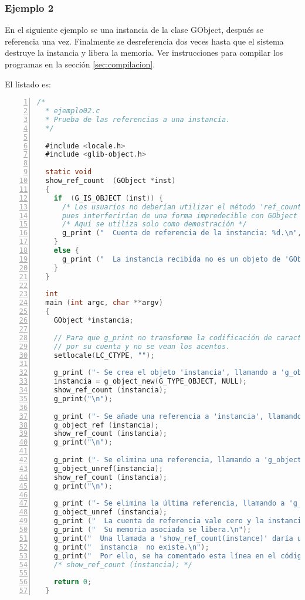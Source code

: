 \subsubsection{Ejemplo 2}
En el siguiente ejemplo se una instancia de la clase \textsf{GObject}, después se
referencia una vez.
Finalmente se desreferencia dos veces hasta que el sistema destruye la instancia y
libera la memoria.
Ver instrucciones para compilar los programas en la sección \ref{sec:compilacion}.

El listado es:
\begin{lstlisting}[language=C, numbers=left]
  /*
  * ejemplo02.c
  * Prueba de las referencias a una instancia.
  */

  #include <locale.h>
  #include <glib-object.h>

  static void
  show_ref_count  (GObject *inst)
  {
    if  (G_IS_OBJECT (inst)) {
      /* Los usuarios no deberían utilizar el método 'ref_count' en sus programas.
      pues interferirían de una forma impredecible con GObject */
      /* Aquí se utiliza solo como demostración */
      g_print ("  Cuenta de referencia de la instancia: %d.\n", inst->ref_count);
    }
    else {
      g_print ("  La instancia recibida no es un objeto de 'GObjectClass'.\n");
    }
  }

  int
  main (int argc, char **argv)
  {
    GObject *instancia;

    // Para que g_print no transforme la codificación de caracteres
    // por su cuenta y no se vean los acentos.
    setlocale(LC_CTYPE, "");

    g_print ("- Se crea el objeto 'instancia', llamando a 'g_object_new'.\n");
    instancia = g_object_new(G_TYPE_OBJECT, NULL);
    show_ref_count (instancia);
    g_print("\n");
  
    g_print ("- Se añade una referencia a 'instancia', llamando a 'g_object_ref'.\n");
    g_object_ref (instancia);
    show_ref_count (instancia);
    g_print("\n");

    g_print ("- Se elimina una referencia, llamando a 'g_object_unref'.\n");
    g_object_unref(instancia);
    show_ref_count (instancia);
    g_print("\n");

    g_print ("- Se elimina la última referencia, llamando a 'g_object_unref'.\n");
    g_object_unref (instancia);
    g_print ("  La cuenta de referencia vale cero y la instancia se destruye.\n");
    g_print ("  Su memoria asociada se libera.\n");
    g_print("  Una llamada a 'show_ref_count(instance)' daría un error, pues la\n");
    g_print("  instancia  no existe.\n");
    g_print("  Por ello, se ha comentado esta línea en el código fuente.\n");
    /* show_ref_count (instancia); */
  
    return 0;
  }
\end{lstlisting}

